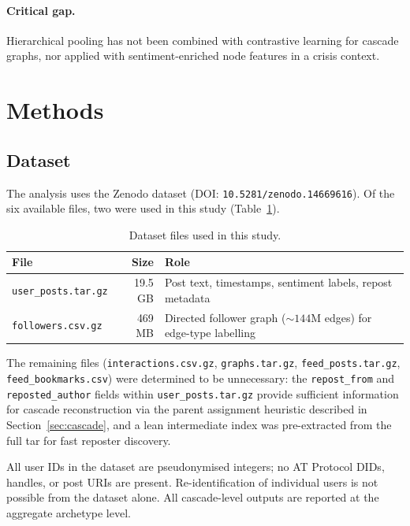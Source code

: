 \documentclass[12pt, a4paper]{article}
\begin{document}
\paragraph{Critical gap.} Hierarchical pooling has not been combined with contrastive learning for cascade graphs, nor applied with sentiment-enriched node features in a crisis context.

\section{Methods}
\label{sec:methods}

\subsection{Dataset}

The analysis uses the \citet{failla2024bluesky} Zenodo dataset (DOI: \texttt{10.5281/zenodo.14669616}). Of the six available files, two were used in this study (Table~\ref{tab:dataset-files}).

\begin{table}[H]
\centering
\caption{Dataset files used in this study.}
\label{tab:dataset-files}
\begin{tabularx}{\textwidth}{@{}lrX@{}}
\toprule
\textbf{File} & \textbf{Size} & \textbf{Role} \\
\midrule
\texttt{user\_posts.tar.gz}  & 19.5 GB & Post text, timestamps, sentiment labels, repost metadata \\
\texttt{followers.csv.gz}    & 469 MB  & Directed follower graph (${\sim}144$M edges) for edge-type labelling \\
\bottomrule
\end{tabularx}
\end{table}

The remaining files (\texttt{interactions.csv.gz}, \texttt{graphs.tar.gz}, \texttt{feed\_posts.tar.gz}, \texttt{feed\_bookmarks.csv}) were determined to be unnecessary: the \texttt{repost\_from} and \texttt{reposted\_author} fields within \texttt{user\_posts.tar.gz} provide sufficient information for cascade reconstruction via the parent assignment heuristic described in Section~\ref{sec:cascade}, and a lean intermediate index was pre-extracted from the full tar for fast reposter discovery.

All user IDs in the dataset are pseudonymised integers; no AT Protocol DIDs, handles, or post URIs are present. Re-identification of individual users is not possible from the dataset alone. All cascade-level outputs are reported at the aggregate archetype level.
\end{document}
